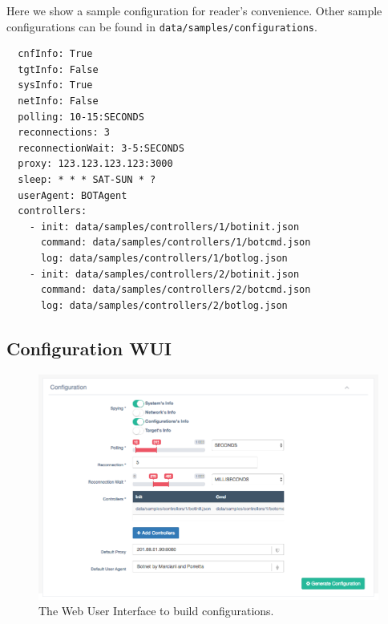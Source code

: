 Here we show a sample configuration for reader's convenience. Other sample configurations can be found in \texttt{data/samples/configurations}.

\begin{verbatim}
  cnfInfo: True
  tgtInfo: False
  sysInfo: True
  netInfo: False
  polling: 10-15:SECONDS
  reconnections: 3
  reconnectionWait: 3-5:SECONDS
  proxy: 123.123.123.123:3000
  sleep: * * * SAT-SUN * ?
  userAgent: BOTAgent
  controllers:
    - init: data/samples/controllers/1/botinit.json
      command: data/samples/controllers/1/botcmd.json
      log: data/samples/controllers/1/botlog.json
    - init: data/samples/controllers/2/botinit.json
      command: data/samples/controllers/2/botcmd.json
      log: data/samples/controllers/2/botlog.json
\end{verbatim}

\subsection{Configuration WUI}\label{sec:configuration-wui}


\begin{figure}[tp]
  \centering
  \includegraphics[scale=0.45]{./fig/configurationWUI.png}
  \caption{The Web User Interface to build configurations.}
    \label{fig:configuration-wui}
\end{figure}

\textcolor{green}{\lipsum[1]}
